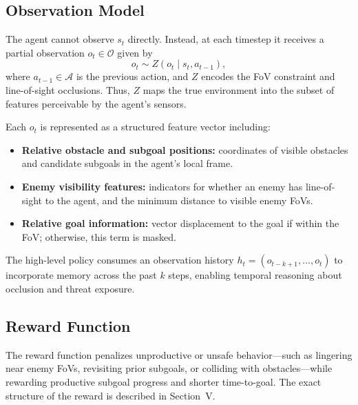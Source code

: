 \documentclass[letterpaper, 10 pt, conference]{ieeeconf}
\begin{document}
\subsection{Observation Model}
The agent cannot observe $s_t$ directly. Instead, at each timestep it receives a partial observation $o_t \in \mathcal{O}$ given by
\begin{equation}
    o_t \sim Z(o_t \mid s_t, a_{t-1}),
\end{equation}
where $a_{t-1} \in \mathcal{A}$ is the previous action, and $Z$ encodes the FoV constraint and line-of-sight occlusions. Thus, $Z$ maps the true environment into the subset of features perceivable by the agent’s sensors.

Each $o_t$ is represented as a structured feature vector including:
\begin{itemize}
    \item \textbf{Relative obstacle and subgoal positions:} coordinates of visible obstacles and candidate subgoals in the agent’s local frame.  
    \item \textbf{Enemy visibility features:} indicators for whether an enemy has line-of-sight to the agent, and the minimum distance to visible enemy FoVs.  
    \item \textbf{Relative goal information:} vector displacement to the goal if within the FoV; otherwise, this term is masked.  
\end{itemize}

The high-level policy consumes an observation history 
$h_t = (o_{t-k+1}, \ldots, o_t)$ 
to incorporate memory across the past $k$ steps, enabling temporal reasoning about occlusion and threat exposure.

\subsection{Reward Function}
The reward function penalizes unproductive or unsafe behavior—such as lingering near enemy FoVs, revisiting prior subgoals, or colliding with obstacles—while rewarding productive subgoal progress and shorter time-to-goal. The exact structure of the reward is described in Section~V.
\end{document}
